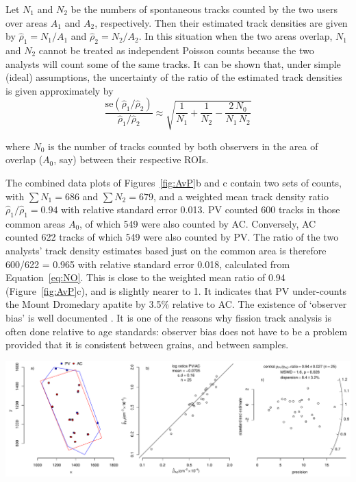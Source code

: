 \documentclass[gchron, manuscript]{copernicus}
\begin{document}
Let $N_1$ and $N_2$ be the numbers of spontaneous tracks counted by
the two users over areas $A_1$ and $A_2$, respectively. Then their
estimated track densities are given by $\hat{\rho}_1 = N_1/A_1$ and
$\hat{\rho}_2 = N_2/A_2$. In this situation when the two areas
overlap, $N_1$ and $N_2$ cannot be treated as independent Poisson
counts because the two analysts will count some of the same tracks. It
can be shown that, under simple (ideal) assumptions, the uncertainty
of the ratio of the estimated track densities is given approximately
by
\begin{equation}
  \frac{\mbox{se}(\hat{\rho}_1/\hat{\rho}_2)}{\hat{\rho}_1/\hat{\rho}_2} \approx
  \sqrt{ \frac{1}{N_1} + \frac{1}{N_2} - \frac{2\,N_0}{N_1\,N_2} }
  \label{eq:NO}
\end{equation}

\noindent where $N_0$ is the number of tracks counted by both
observers in the area of overlap ($A_0$, say) between their respective
ROIs.\medskip 

The combined data plots of Figures~\ref{fig:AvP}b and c contain two
sets of counts, with $\sum N_{1} = 686$ and $\sum N_{2} = 679$, and a
weighted mean track density ratio $\hat{\rho}_{1}/\hat{\rho}_{1} =
0.94$ with relative standard error 0.013. PV counted 600 tracks in
those common areas $A_0$, of which 549 were also counted by
AC. Conversely, AC counted 622 tracks of which 549 were also counted
by PV. The ratio of the two analysts' track density estimates based
just on the common area is therefore 600/622 = 0.965 with relative
standard error 0.018, calculated from Equation~\ref{eq:NO}. This is
close to the weighted mean ratio of 0.94 (Figure~\ref{fig:AvP}c), and
is slightly nearer to 1. It indicates that PV under-counts the Mount
Dromedary apatite by 3.5\% relative to AC.  The existence of `observer
bias' is well documented \citep{tamer2025}.  It is one of the reasons
why fission track analysis is often done relative to age standards:
observer bias does not have to be a problem provided that it is
consistent between grains, and between samples.\medskip

{ \centering \includegraphics[width=\linewidth]{AvP.pdf}
  \label{fig:AvP}
}%
\end{document}
